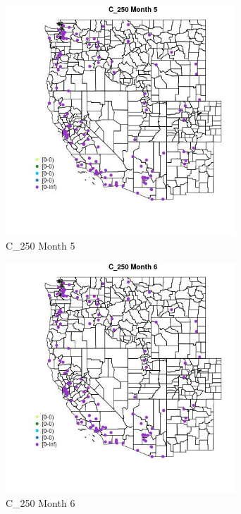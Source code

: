 \begin{figure} 
\centering  
\includegraphics[width=0.77\textwidth]{Code_Outputs/Report_ML_input_PM25_Step4_part_e_de_duplicated_aves_MapObsMo5C_250.jpg} 
\caption{\label{fig:Report_ML_input_PM25_Step4_part_e_de_duplicated_avesMapObsMo5C_250}C_250 Month 5} 
\end{figure} 
 

\begin{figure} 
\centering  
\includegraphics[width=0.77\textwidth]{Code_Outputs/Report_ML_input_PM25_Step4_part_e_de_duplicated_aves_MapObsMo6C_250.jpg} 
\caption{\label{fig:Report_ML_input_PM25_Step4_part_e_de_duplicated_avesMapObsMo6C_250}C_250 Month 6} 
\end{figure} 
 

